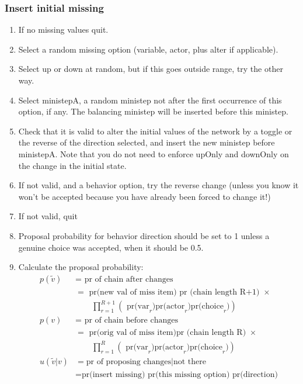 \documentclass[12pt,a4paper]{article}
\renewcommand{\=}{\,=\,}
\newcommand{\+}{\,+\,}
\begin{document}
\subsubsection{Insert initial missing}
\begin{enumerate}
\item If no missing values quit.
\item Select a random missing option (variable, actor, plus alter if applicable).
\item
\begin{algorithmic}
\STATE Select up or down at random, but if this goes outside range, try the
other way.
\ENDIF
\end{algorithmic}
\item Select ministepA, a random ministep not after the first occurrence of this
  option, if any. The balancing ministep will be inserted before this ministep.
\item Check that it is valid to alter the initial values of the network by a
  toggle or the reverse of the direction selected, and insert the new ministep
  before  ministepA. Note that you do not need to enforce upOnly and downOnly
  on the change in the initial state.
\item If not valid, and a behavior option, try the reverse change (unless you
  know it won't be accepted because you have already been forced to change it!)
\item If not valid, quit
\item Proposal probability for behavior direction should be set to 1 unless a
  genuine choice was accepted, when it should be 0.5.
\item Calculate the proposal probability:
\begin{align*}
p(\tilde{v})&=\text{ pr of chain after changes}\\
& = \text{ pr(new val of miss item) pr (chain length R+1) } \times\\
& \qquad  \prod_{r=1}^{R+1} \left( \text{ pr(var}_r )
\text{pr(actor}_r)\text{pr(choice}_r) \right)\\
p(v)&=\text{ pr of chain before changes}\\
& = \text{ pr(orig val of miss item)pr (chain length R) }\times \\
& \qquad \prod_{r=1}^{R} \left( \text{ pr(var}_r )
\text{pr(actor}_r)\text{pr(choice}_r) \right)\\
u(\tilde{v}|v) &= \text{pr of proposing changes} | \text{not
  there}\\
&=\text{pr(insert missing) pr(this missing option) pr(direction)
}
\end{align*}
\end{enumerate}
\end{document}
